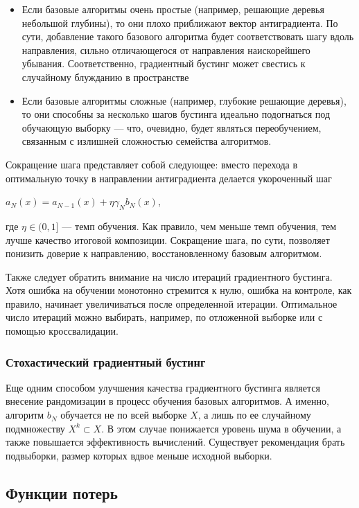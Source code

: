 \documentclass{article}
\theoremstyle{definition}
\theoremstyle{theorem}
\theoremstyle{remark}
\theoremstyle{theorem}
\theoremstyle{example}
\theoremstyle{theorem}
\theoremstyle{theorem}
\theoremstyle{theorem}
\theoremstyle{theorem}
\begin{document}
\begin{itemize}
	\item Если базовые алгоритмы очень простые (например, решающие деревья небольшой глубины), то они плохо приближают вектор антиградиента. По сути, добавление такого базового алгоритма будет соответствовать шагу вдоль направления, сильно отличающегося от направления наискорейшего убывания. Соответственно, градиентный бустинг может свестись к случайному блужданию в
	пространстве
	\item Если базовые алгоритмы сложные (например, глубокие решающие деревья), то они способны за несколько шагов бустинга идеально подогнаться под обучающую выборку — что, очевидно, будет являться переобучением, связанным с излишней сложностью семейства алгоритмов.
\end{itemize}

Сокращение шага представляет собой следующее: вместо перехода в оптимальную точку в направлении антиградиента
делается укороченный шаг

$a_N(x) = a_{N-1}(x) + \eta\gamma_Nb_N(x)$,

где $\eta \in (0,1]$ --- темп обучения. Как правило, чем меньше темп обучения, тем лучше качество итоговой композиции. Сокращение шага, по сути, позволяет понизить доверие к направлению, восстановленному базовым алгоритмом.

Также следует обратить внимание на число итераций градиентного бустинга. Хотя ошибка на обучении монотонно стремится к нулю, ошибка на контроле, как правило, начинает увеличиваться после определенной итерации. Оптимальное число итераций можно выбирать, например, по отложенной выборке или с помощью кроссвалидации.


\subsubsection{Стохастический градиентный бустинг}

Еще одним способом улучшения качества градиентного бустинга является внесение рандомизации в процесс обучения базовых алгоритмов. А именно, алгоритм $b_N$ обучается не по всей выборке $X$, а лишь по ее случайному подмножеству $X^k \subset X$. В этом случае понижается уровень шума в обучении, а также повышается эффективность вычислений. Существует рекомендация брать подвыборки, размер которых вдвое меньше исходной выборки.

\subsection{Функции потерь}
\end{document}
